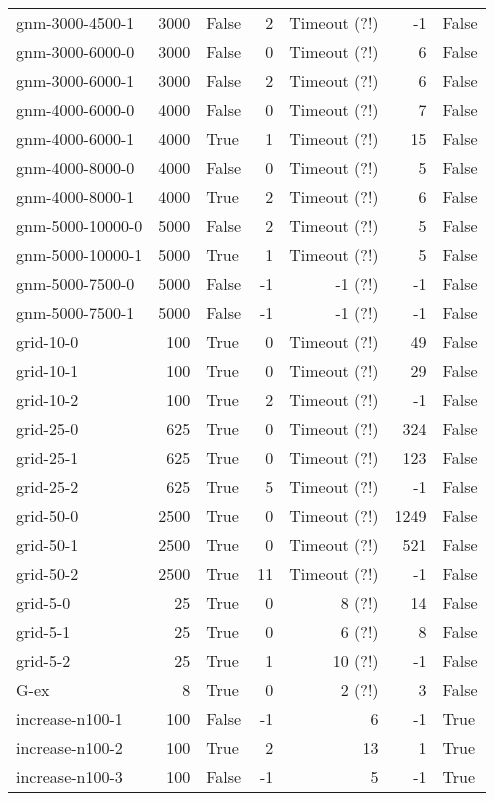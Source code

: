 \begin{longtable}{lrlrrrl}
gnm-3000-4500-1 & 3000 & False & 2 & Timeout (?!) & -1 & False \\
gnm-3000-6000-0 & 3000 & False & 0 & Timeout (?!) & 6 & False \\
gnm-3000-6000-1 & 3000 & False & 2 & Timeout (?!) & 6 & False \\
gnm-4000-6000-0 & 4000 & False & 0 & Timeout (?!) & 7 & False \\
gnm-4000-6000-1 & 4000 & True & 1 & Timeout (?!) & 15 & False \\
gnm-4000-8000-0 & 4000 & False & 0 & Timeout (?!) & 5 & False \\
gnm-4000-8000-1 & 4000 & True & 2 & Timeout (?!) & 6 & False \\
gnm-5000-10000-0 & 5000 & False & 2 & Timeout (?!) & 5 & False \\
gnm-5000-10000-1 & 5000 & True & 1 & Timeout (?!) & 5 & False \\
gnm-5000-7500-0 & 5000 & False & -1 & -1 (?!) & -1 & False \\
gnm-5000-7500-1 & 5000 & False & -1 & -1 (?!) & -1 & False \\
grid-10-0 & 100 & True & 0 & Timeout (?!) & 49 & False \\
grid-10-1 & 100 & True & 0 & Timeout (?!) & 29 & False \\
grid-10-2 & 100 & True & 2 & Timeout (?!) & -1 & False \\
grid-25-0 & 625 & True & 0 & Timeout (?!) & 324 & False \\
grid-25-1 & 625 & True & 0 & Timeout (?!) & 123 & False \\
grid-25-2 & 625 & True & 5 & Timeout (?!) & -1 & False \\
grid-50-0 & 2500 & True & 0 & Timeout (?!) & 1249 & False \\
grid-50-1 & 2500 & True & 0 & Timeout (?!) & 521 & False \\
grid-50-2 & 2500 & True & 11 & Timeout (?!) & -1 & False \\
grid-5-0 & 25 & True & 0 & 8 (?!) & 14 & False \\
grid-5-1 & 25 & True & 0 & 6 (?!) & 8 & False \\
grid-5-2 & 25 & True & 1 & 10 (?!) & -1 & False \\
G-ex & 8 & True & 0 & 2 (?!) & 3 & False \\
increase-n100-1 & 100 & False & -1 & 6 & -1 & True \\
increase-n100-2 & 100 & True & 2 & 13 & 1 & True \\
increase-n100-3 & 100 & False & -1 & 5 & -1 & True \\

\end{longtable}
